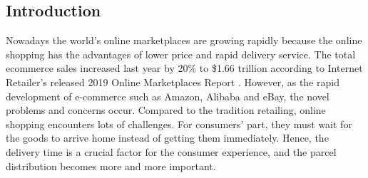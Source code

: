 \documentclass[12pt]{ksthesis}
\begin{document}
\begin{thesis}\large {
\chapter{Introduction} \label{Chap:Introduction}

Nowadays the world’s online marketplaces are growing rapidly because the online shopping has the advantages of lower price and rapid delivery service. The total ecommerce sales increased last year by 20\% to \$1.66 trillion according to Internet Retailer’s released 2019 Online Marketplaces Report \cite{KeyFindings}. However, as the rapid development of e-commerce such as Amazon, Alibaba and eBay, the novel problems and concerns occur. Compared to the tradition retailing, online shopping encounters lots of challenges. For consumers’ part, they must wait for the goods to arrive home instead of getting them immediately. Hence, the delivery time is a crucial factor for the consumer experience, and the parcel distribution becomes more and more important. 




}
\end{thesis}
\end{document}

